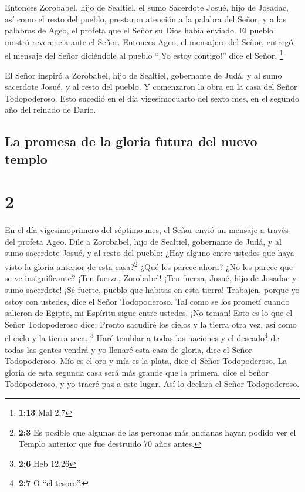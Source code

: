  Entonces Zorobabel, hijo de Sealtiel, el sumo Sacerdote
Josué, hijo de Josadac, así como el resto del pueblo, prestaron atención
a la palabra del Señor, y a las palabras de Ageo, el profeta que el
Señor su Dios había enviado. El pueblo mostró reverencia ante el Señor.
 Entonces Ageo, el mensajero del Señor, entregó el
mensaje del Señor diciéndole al pueblo ``¡Yo estoy contigo!'' dice el
Señor. \footnote{\textbf{1:13} Mal 2,7}

 El Señor inspiró a Zorobabel, hijo de Sealtiel,
gobernante de Judá, y al sumo sacerdote Josué, y al resto del pueblo. Y
comenzaron la obra en la casa del Señor Todopoderoso. 
Esto sucedió en el día vigesimocuarto del sexto mes, en el segundo año
del reinado de Darío.

\hypertarget{la-promesa-de-la-gloria-futura-del-nuevo-templo}{%
\subsection{La promesa de la gloria futura del nuevo
templo}\label{la-promesa-de-la-gloria-futura-del-nuevo-templo}}

\hypertarget{section-1}{%
\section{2}\label{section-1}}

 En el día vigesimoprimero del séptimo mes, el Señor envió
un mensaje a través del profeta Ageo.  Dile a Zorobabel,
hijo de Sealtiel, gobernante de Judá, y al sumo sacerdote Josué, y al
resto del pueblo:  ¿Hay alguno entre ustedes que haya
visto la gloria anterior de esta casa?\footnote{\textbf{2:3} Es posible
  que algunas de las personas más ancianas hayan podido ver el Templo
  anterior que fue destruido 70 años antes.} ¿Qué les parece ahora? ¿No
les parece que se ve insignificante?  ¡Ten fuerza,
Zorobabel! ¡Ten fuerza, Josué, hijo de Josadac y sumo sacerdote! ¡Sé
fuerte, pueblo que habitas en esta tierra! Trabajen, porque yo estoy con
ustedes, dice el Señor Todopoderoso.  Tal como se los
prometí cuando salieron de Egipto, mi Espíritu sigue entre ustedes. ¡No
teman!  Esto es lo que el Señor Todopoderoso dice: Pronto
sacudiré los cielos y la tierra otra vez, así como el cielo y la tierra
seca. \footnote{\textbf{2:6} Heb 12,26}  Haré temblar a
todas las naciones y el deseado\footnote{\textbf{2:7} O ``el tesoro''.}
de todas las gentes vendrá y yo llenaré esta casa de gloria, dice el
Señor Todopoderoso.  Mío es el oro y mía es la plata, dice
el Señor Todopoderoso.  La gloria de esta segunda casa
será más grande que la primera, dice el Señor Todopoderoso, y yo traeré
paz a este lugar. Así lo declara el Señor Todopoderoso.

